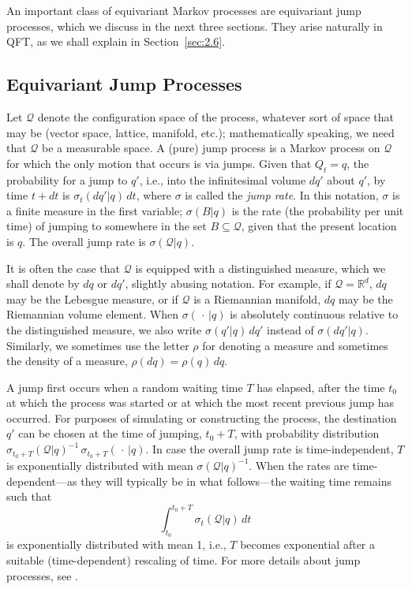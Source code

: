 \documentclass[12pt]{article}
\newcommand{\RRR}{\mathbb{R}} %
\newcommand{\1}{\mathbf{1}} %
\newcommand{\conf}{\mathcal{Q}} %
\begin{document}
An important class of equivariant Markov processes are equivariant
jump processes, which we discuss in the next three sections. They
arise naturally in QFT, as we shall explain in Section~\ref{sec:2.6}.



\subsection{Equivariant Jump Processes}\label{sec:revjump}

Let $\conf$ denote the configuration space of the process,
whatever sort of space that may be (vector space, lattice, manifold,
etc.); mathematically speaking, we need that $\conf$ be a measurable
space.  A (pure) jump process is a Markov process on $\conf$ for which
the only motion that occurs is via jumps. Given that $Q_t =q$, the
probability for a jump to $q'$, i.e., into the infinitesimal volume
$dq'$ about $q'$, by time $t+dt$ is $\sigma_t(dq'|q)\, dt$, where
$\sigma$ is called the \emph{jump rate}. In this notation, $\sigma$ is
a finite measure in the first variable; $\sigma(B|q)$ is the rate (the
probability per unit time) of jumping to somewhere in the set
$B\subseteq\conf$, given that the present location is $q$. The overall
jump rate is $\sigma(\conf|q)$.

It is often the case that $\conf$ is equipped with a distinguished
measure, which we shall denote by $dq$ or $dq'$, slightly abusing
notation.  For example, if $\conf = \RRR^d$, $dq$ may be the Lebesgue
measure, or if $\conf$ is a Riemannian manifold, $dq$ may be the
Riemannian volume element. When $\sigma(\,\cdot\,|q)$ is absolutely
continuous relative to the distinguished measure, we also write
$\sigma(q'|q)\, dq'$ instead of $\sigma(dq'|q)$.  Similarly, we
sometimes use the letter $\rho$ for denoting a measure and sometimes
the density of a measure, $\rho(dq) = \rho(q)\,dq$.

A jump first occurs when a random waiting time $T$ has elapsed, after 
the
time $t_0$ at which the process was started or at which the most
recent previous jump has occurred.  For purposes of simulating or
constructing the process, the destination $q'$ can be chosen at the
time of jumping, $t_0 + T$, with probability distribution
$\sigma_{t_0+T} (\conf|q)^{-1} \, \sigma_{t_0+T} (\,\cdot\,|q)$. In
case the overall jump rate is time-independent, $T$ is exponentially
distributed with mean $\sigma(\conf|q)^{-1}$. When the
rates are time-dependent---as they will typically be in what
follows---the waiting time remains such that
\[
   \int_{t_0}^{t_0+T} \sigma_t(\conf|q) \, dt
\]
is exponentially distributed with mean 1, i.e., $T$ becomes
exponential after a suitable (time-dependent) rescaling of time. For
more details about jump processes, see \cite{Breiman}.
\end{document}
